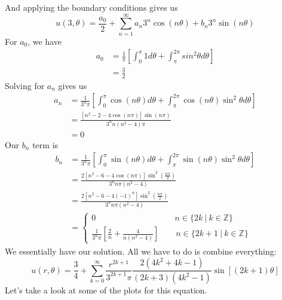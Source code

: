 \documentclass{article}
\begin{document}
And applying the boundary conditions gives us
\[
u(3,\theta) = \frac{a_{0}}{2} + \sum_{n=1}^{\infty}a_{n}3^{n}\cos{(n\theta)} + b_{n}3^{n}\sin{(n\theta)}
\]
For $a_{0}$, we have
\begin{align*}
a_{0} &= \frac{1}{\pi}\left[\int_{0}^{\pi}1 d\theta + \int_{\pi}^{2\pi}sin^{2}{\theta}d\theta\right]\\
&= \frac{3}{2}
\end{align*}
Solving for $a_{n}$ gives us
\begin{align*}
a_{n} &= \frac{1}{3^{n}\pi}\left[\int_{0}^{\pi}\cos{(n\theta)}d\theta + \int_{\pi}^{2\pi}\cos{(n\theta)}\sin^{2}{\theta}d\theta\right]\\
&= \frac{[n^{2} - 2 - 4\cos{(n\pi)}]\sin{(n\pi)}}{3^{n}n(n^{2}-4)\pi}\\
&= 0
\end{align*}
Our $b_{n}$ term is
\begin{align*}
b_{n} &= \frac{1}{3^{n}\pi}\left[\int_{0}^{\pi}\sin{(n\theta)}d\theta + \int_{\pi}^{2\pi}\sin{(n\theta)}\sin^{2}{\theta}d\theta\right]\\
&= \frac{2\left[n^{2} - 6 - 4\cos{(n\pi)}\right]\sin^{2}{\left(\frac{n\pi}{2}\right)}}{3^{n}n\pi(n^{2} - 4)}\\
&= \frac{2\left[n^{2} - 6 - 4(-1)^{n}\right]\sin^{2}{\left(\frac{n\pi}{2}\right)}}{3^{n}n\pi(n^{2} - 4)}\\
&=
\begin{cases*}
0 \qquad\qquad\qquad\qquad\quad\ \ n \in \{ 2k\ |\ k \in \mathbb{Z} \}\\
\frac{1}{3^{n}\pi}\left[\frac{2}{n} + \frac{4}{n(n^{2} - 4)}\right]\qquad n \in \{ 2k + 1\ |\ k \in \mathbb{Z} \}
\end{cases*}
\end{align*}
We essentially have our solution. All we have to do is combine everything:
\[
u(r,\theta) = \frac{3}{4} + \sum_{k=0}^{\infty}\frac{r^{2k + 1}}{3^{2k+1}\pi}\frac{2(4k^{2} + 4k -1)}{(2k + 3)(4k^{2} -1)}\sin{\left[(2k +1)\theta\right]}
\]
Let's take a look at some of the plots for this equation.\\
\end{document}
